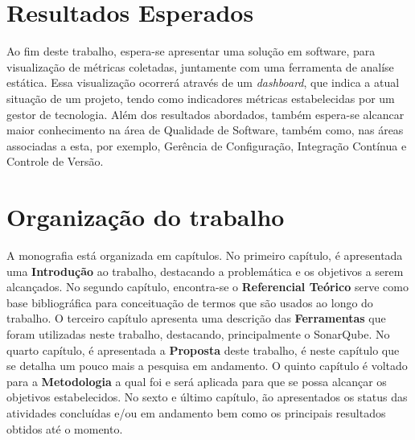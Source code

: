	
	\section{Resultados Esperados}

Ao fim deste trabalho, espera-se apresentar uma solução em software, para visualização de métricas coletadas,  juntamente com uma ferramenta de analíse estática. Essa visualização ocorrerá através de um \textit{dashboard}, que indica a atual situação de um projeto, tendo como indicadores métricas estabelecidas por um gestor de tecnologia. 
Além dos resultados abordados, também espera-se alcancar maior conhecimento na área de Qualidade de Software, também como, nas áreas associadas a esta, por exemplo, Gerência de Configuração, Integração Contínua e Controle de Versão.

	\section{Organização do trabalho} %
	\label{sec:organização_do_trabalho} 	
A monografia está organizada em capítulos. No primeiro capítulo, é apresentada uma \textbf{Introdução} ao trabalho, destacando a problemática e os objetivos a serem alcançados. No segundo capítulo, encontra-se o \textbf{Referencial Teórico} serve como base bibliográfica para conceituação de termos que são usados ao longo do trabalho. O terceiro capítulo apresenta uma descrição das \textbf{Ferramentas} que foram utilizadas neste trabalho, destacando, principalmente o SonarQube. No quarto capítulo, é apresentada a \textbf{Proposta} deste trabalho, é neste capítulo que se detalha um pouco mais a pesquisa em andamento. O quinto capítulo é voltado para a \textbf{Metodologia} a qual foi e será aplicada para que se possa alcançar os objetivos estabelecidos. No sexto e último capítulo, ão apresentados os status das atividades concluídas e/ou em andamento bem como os principais resultados obtidos até o momento.
